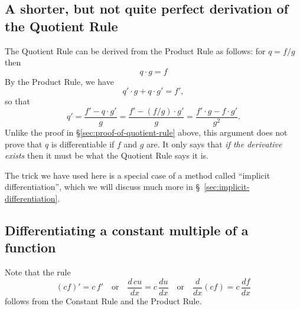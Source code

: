 \subsection{A shorter, but not quite perfect derivation of the Quotient Rule} 
The Quotient Rule can be derived from the Product Rule as follows: for $q=f/g$ then
\begin{equation}\label{eq:quotient-implicity-defined}
  q\cdot g=f
\end{equation}
By the Product Rule, we have
\[
q'\cdot g+q\cdot g'=f',
\]
so that
\[
q' = \frac{f'-q\cdot g'}{g}
= \frac{f'-(f/g)\cdot g'}{g}
=\frac{f'\cdot g-f\cdot g'}{g^2}.
\]
Unlike the proof in \S\ref{sec:proof-of-quotient-rule} above, this argument does
  not prove that $q$ is differentiable if $f$ and $g$ are.
It only says that \emph{if the derivative exists} then it must be what the
Quotient Rule says it is.




The trick we have used here is a special case of a method called ``implicit
differentiation'', which we will discuss much more in
\S~\ref{sec:implicit-differentiation}.




\subsection{Differentiating a constant multiple of a function} 
\label{par:derivative-of-constant-multiple}
Note that the rule
\[
(cf)'=c\,f'
\quad\text{or}\quad
\frac{d\,cu} {dx} = c\, \frac{du} {dx}
\quad\text{or}\quad
\frac{d}{dx}(cf) = c\, \frac{df} {dx}
\]
follows from the Constant Rule and the Product Rule.




